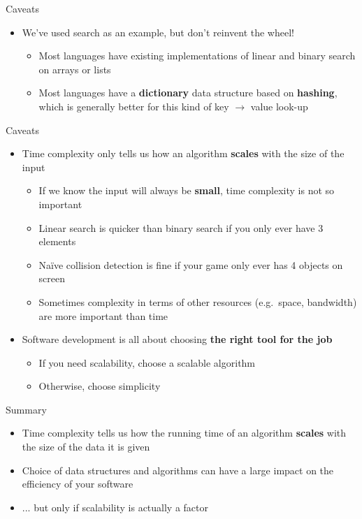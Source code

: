 \begin{frame}{Caveats}
	\begin{itemize}
		\item We've used search as an example, but don't reinvent the wheel! \pause
			\begin{itemize}
				\item Most languages have existing implementations of linear and binary search on arrays or lists \pause
				\item Most languages have a \textbf{dictionary} data structure based on \textbf{hashing},
					which is generally better for this kind of key $\to$ value look-up
			\end{itemize}
	\end{itemize}
\end{frame}

\begin{frame}{Caveats}
	\begin{itemize}
		\item Time complexity only tells us how an algorithm \textbf{scales} with the size of the input \pause
			\begin{itemize}
				\item If we know the input will always be \textbf{small}, time complexity is not so important \pause
				\item Linear search is quicker than binary search if you only ever have 3 elements \pause
				\item Na\"ive collision detection is fine if your game only ever has 4 objects on screen \pause
				\item Sometimes complexity in terms of other resources (e.g.\ space, bandwidth) are more important than time \pause
			\end{itemize}
		\item Software development is all about choosing \textbf{the right tool for the job} \pause
			\begin{itemize}
				\item If you need scalability, choose a scalable algorithm \pause
				\item Otherwise, choose simplicity
			\end{itemize}
	\end{itemize}
\end{frame}

\begin{frame}{Summary}
	\begin{itemize}
		\item Time complexity tells us how the running time of an algorithm \textbf{scales} with the size of the data
			it is given \pause
		\item Choice of data structures and algorithms can have a large impact on the efficiency of your software \pause
		\item ... but only if scalability is actually a factor
	\end{itemize}
\end{frame}
